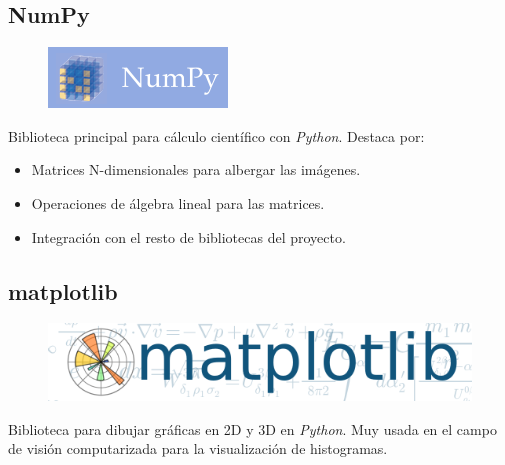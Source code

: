 \subsection{NumPy}
\begin{figure}[H]
  \includegraphics[scale=0.5]{imagenes/logos/numpy_logo.png}
\end{figure}
Biblioteca principal para cálculo científico con
\emph{Python}. Destaca por:
\begin{itemize}
\item Matrices N-dimensionales para albergar las imágenes.
\item Operaciones de álgebra lineal para las matrices.
\item Integración con el resto de bibliotecas del proyecto.
\end{itemize}

\subsection{matplotlib}
\begin{figure}[H]
  \includegraphics[scale=0.2]{imagenes/logos/matplotlib_logo.png}
\end{figure}
Biblioteca para dibujar gráficas en 2D y 3D en \emph{Python}. Muy
usada en el campo de visión computarizada para la visualización de
histogramas.

